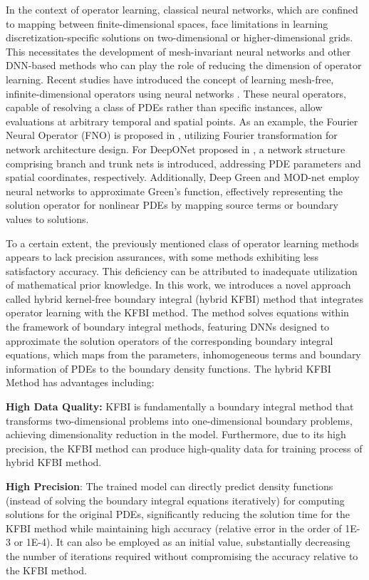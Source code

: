 \documentclass{article}
\begin{document}
In the context of operator learning, classical neural networks, which are confined to mapping between finite-dimensional spaces, face limitations in learning discretization-specific solutions on two-dimensional or higher-dimensional grids. This necessitates the development of mesh-invariant neural networks and other DNN-based methods who can play the role of reducing the dimension of operator learning. Recent studies have introduced the concept of learning mesh-free, infinite-dimensional operators using neural networks \cite{li2021fourier,lulu2021deeponet,Bhattacharya2021,Nelsen2021,Patel2021}. These neural operators, capable of resolving a class of PDEs rather than specific instances, allow evaluations at arbitrary temporal and spatial points. As an example, the Fourier Neural Operator (FNO) is proposed in \cite{li2021fourier}, utilizing Fourier transformation for network architecture design. For DeepONet proposed in \cite{lulu2021deeponet}, a network structure comprising branch and trunk nets is introduced, addressing PDE parameters and spatial coordinates, respectively. Additionally, Deep Green \cite{Gin2021} and MOD-net \cite{CiCP-32-299} employ neural networks to approximate Green's function, effectively representing the solution operator for nonlinear PDEs by mapping source terms or boundary values to solutions.

To a certain extent, the previously mentioned class of operator learning methods appears to lack precision assurances, with some methods exhibiting less satisfactory accuracy. This deficiency can be attributed to inadequate utilization of mathematical prior knowledge. In this work, we introduces a novel approach called hybrid kernel-free boundary integral (hybrid KFBI) method that integrates operator learning with the KFBI method. The method solves equations within the framework of boundary integral methods, featuring DNNs designed to approximate the solution operators of the corresponding boundary integral equations, which maps from the parameters, inhomogeneous terms and boundary information of PDEs to the boundary density functions. The hybrid KFBI Method has advantages including:

\textbf{High Data Quality:} KFBI is fundamentally a boundary integral method that transforms two-dimensional problems into one-dimensional boundary problems, achieving dimensionality reduction in the model. Furthermore, due to its high precision, the KFBI method can produce high-quality data for training process of hybrid KFBI method. 

\textbf{High Precision}: The trained model can directly predict density functions (instead of solving the boundary integral equations iteratively) for computing solutions for the original PDEs, significantly reducing the solution time for the KFBI method while maintaining high accuracy (relative error in the order of 1E-3 or 1E-4). It can also be employed as an initial value, substantially decreasing the number of iterations required without compromising the accuracy relative to the KFBI method.
\end{document}
